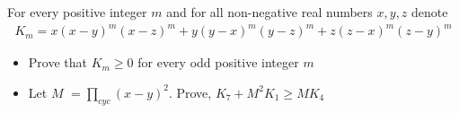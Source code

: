 For every positive integer $m$ and for all non-negative real numbers $x,y,z$ denote
\begin{align*} K_m =x(x-y)^m (x-z)^m + y (y-x)^m (y-z)^m + z(z-x)^m (z-y)^m \end{align*}
\begin{itemize}
	\item Prove that $K_m \geq 0$ for every odd positive integer $m$
	\item Let $M$ $= \prod_{cyc} (x-y)^2$. Prove, $K_7+M^2 K_1 \geq M K_4$
\end{itemize}
